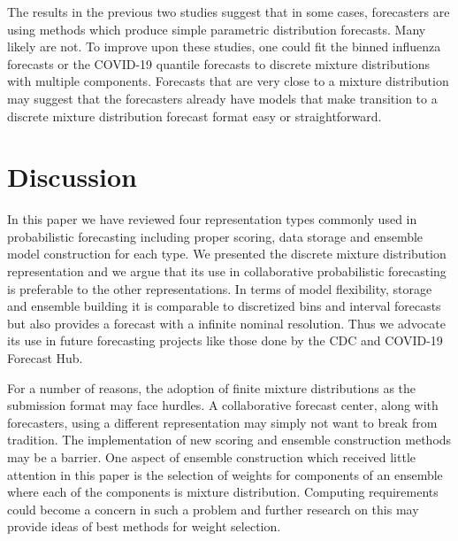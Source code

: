 \documentclass[11pt,notitlepage]{isuthesis}
\begin{document}
The results in the previous two studies suggest that in some cases, forecasters
are using methods which produce simple parametric distribution forecasts. Many
likely are not. To improve upon these studies, one could fit the binned 
influenza forecasts or the COVID-19 quantile forecasts to discrete mixture 
distributions with multiple components. Forecasts that are very close to 
a mixture distribution may suggest that the forecasters already have models that
make transition to a discrete mixture distribution forecast format easy or
straightforward.














\newpage


\section{Discussion}

In this paper we have reviewed four representation types commonly used in
probabilistic 
forecasting including proper scoring, data storage and ensemble model 
construction for each type. We presented the discrete mixture distribution
representation and we argue that its use in collaborative probabilistic 
forecasting is preferable to the other representations.
In terms of model flexibility, storage and 
ensemble building it is
comparable to discretized bins and interval forecasts but also provides a 
forecast with a infinite nominal resolution. Thus we advocate its use in
future forecasting projects like those done by the CDC and COVID-19 Forecast 
Hub.

For a number of reasons, the adoption of finite mixture distributions as the
submission format may face hurdles. A collaborative forecast center, along with 
forecasters, using a 
different representation may simply not want to break from tradition. The 
implementation of new scoring and ensemble construction methods may be a 
barrier. One aspect of ensemble construction which received little attention in 
this paper is the selection of weights for components of an ensemble where each
of the components is mixture distribution. Computing requirements could become a
concern in such a problem and further research on this may provide
ideas of best methods for weight selection.
\end{document}
